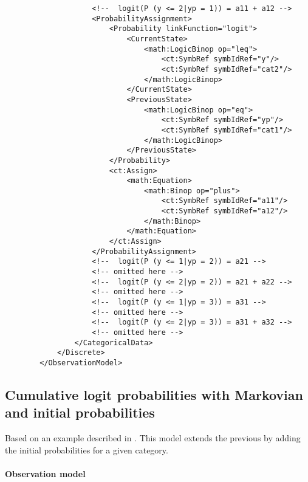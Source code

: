 \begin{lstlisting}
                    <!--  logit(P (y <= 2|yp = 1)) = a11 + a12 -->
                    <ProbabilityAssignment>
                        <Probability linkFunction="logit">
                            <CurrentState>
                                <math:LogicBinop op="leq">
                                    <ct:SymbRef symbIdRef="y"/>
                                    <ct:SymbRef symbIdRef="cat2"/>
                                </math:LogicBinop>
                            </CurrentState>
                            <PreviousState>
                                <math:LogicBinop op="eq">
                                    <ct:SymbRef symbIdRef="yp"/>
                                    <ct:SymbRef symbIdRef="cat1"/>
                                </math:LogicBinop>
                            </PreviousState>
                        </Probability>
                        <ct:Assign>
                            <math:Equation>
                                <math:Binop op="plus">
                                    <ct:SymbRef symbIdRef="a11"/>
                                    <ct:SymbRef symbIdRef="a12"/>
                                </math:Binop>
                            </math:Equation>
                        </ct:Assign>
                    </ProbabilityAssignment>
                    <!--  logit(P (y <= 1|yp = 2)) = a21 -->
                    <!-- omitted here -->
                    <!--  logit(P (y <= 2|yp = 2)) = a21 + a22 -->
                    <!-- omitted here -->
                    <!--  logit(P (y <= 1|yp = 3)) = a31 -->
                    <!-- omitted here -->
                    <!--  logit(P (y <= 2|yp = 3)) = a31 + a32 -->
                    <!-- omitted here -->
                </CategoricalData>
            </Discrete>
        </ObservationModel>
\end{lstlisting}



\subsection{Cumulative logit probabilities with Markovian and initial probabilities}
Based on an example described in \cite{MLXTRANforMonolix:2014}. 
This model extends the previous by adding the initial probabilities for a given category.

\paragraph{Observation model}

